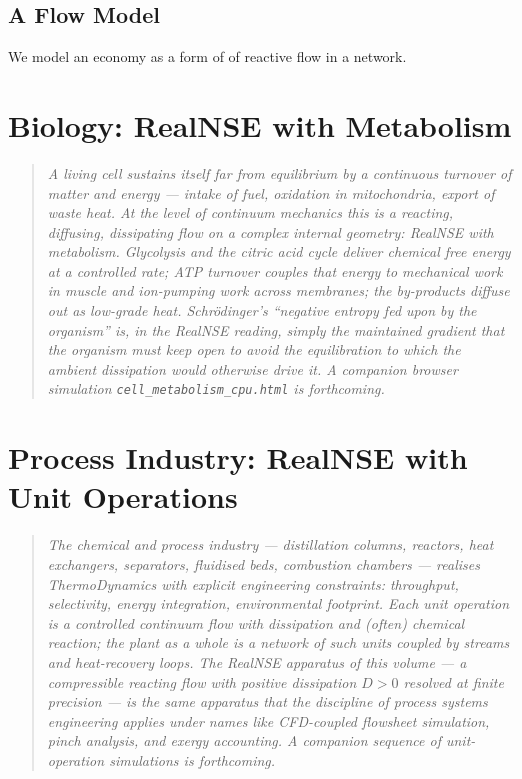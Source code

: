 \section{A Flow Model}
We model an economy as a form of of reactive flow in a network.




\chapter{Biology: RealNSE with Metabolism}

\begin{quote}\itshape
A living cell sustains itself far from equilibrium by a continuous turnover
of matter and energy --- intake of fuel, oxidation in mitochondria, export
of waste heat. At the level of continuum mechanics this is a reacting,
diffusing, dissipating flow on a complex internal geometry: RealNSE with
metabolism. Glycolysis and the citric acid cycle deliver chemical free
energy at a controlled rate; ATP turnover couples that energy to mechanical
work in muscle and ion-pumping work across membranes; the by-products
diffuse out as low-grade heat. Schr\"odinger's ``negative entropy fed upon
by the organism'' is, in the RealNSE reading, simply the maintained gradient
that the organism must keep open to avoid the equilibration to which the
ambient dissipation would otherwise drive it. A companion browser
simulation \texttt{cell\_metabolism\_cpu.html} is forthcoming.
\end{quote}

\chapter{Process Industry: RealNSE with Unit Operations}

\begin{quote}\itshape
The chemical and process industry --- distillation columns, reactors,
heat exchangers, separators, fluidised beds, combustion chambers ---
realises ThermoDynamics with explicit engineering constraints: throughput,
selectivity, energy integration, environmental footprint. Each unit
operation is a controlled continuum flow with dissipation and (often)
chemical reaction; the plant as a whole is a network of such units coupled
by streams and heat-recovery loops. The RealNSE apparatus of this volume --- a
compressible reacting flow with positive dissipation $D > 0$ resolved at
finite precision --- is the same apparatus that the discipline of process
systems engineering applies under names like CFD-coupled flowsheet
simulation, pinch analysis, and exergy accounting. A companion sequence
of unit-operation simulations is forthcoming.
\end{quote}

